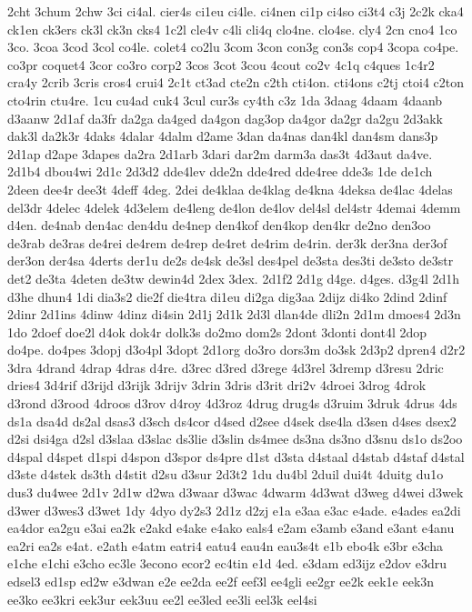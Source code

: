 {2cht
3chum
2chw
3ci
ci4al.
cier4s
ci1eu
ci4le.
ci4nen
ci1p
ci4so
ci3t4
c3j
2c2k
cka4
ck1en
ck3ers
ck3l
ck3n
cks4
1c2l
cle4v
c4li
cli4q
clo4ne.
clo4se.
cly4
2cn
cno4
1co
3co.
3coa
3cod
3col
co4le.
colet4
co2lu
3com
3con
con3g
con3s
cop4
3copa
co4pe.
co3pr
coquet4
3cor
co3ro
corp2
3cos
3cot
3cou
4cout
co2v
4c1q
c4ques
1c4r2
cra4y
2crib
3cris
cros4
crui4
2c1t
ct3ad
cte2n
c2th
cti4on.
cti4ons
c2tj
ctoi4
c2ton
cto4rin
ctu4re.
1cu
cu4ad
cuk4
3cul
cur3s
cy4th
c3z
1da
3daag
4daam
4daanb
d3aanw
2d1af
da3fr
da2ga
da4ged
da4gon
dag3op
da4gor
da2gr
da2gu
2d3akk
dak3l
da2k3r
4daks
4dalar
4dalm
d2ame
3dan
da4nas
dan4kl
dan4sm
dans3p
2d1ap
d2ape
3dapes
da2ra
2d1arb
3dari
dar2m
darm3a
das3t
4d3aut
da4ve.
2d1b4
dbou4wi
2d1c
2d3d2
dde4lev
dde2n
dde4red
dde4ree
dde3s
1de
de1ch
2deen
dee4r
dee3t
4deff
4deg.
2dei
de4klaa
de4klag
de4kna
4deksa
de4lac
4delas
del3dr
4delec
4delek
4d3elem
de4leng
de4lon
de4lov
del4sl
del4str
4demai
4demm
d4en.
de4nab
den4ac
den4du
de4nep
den4kof
den4kop
den4kr
de2no
den3oo
de3rab
de3ras
de4rei
de4rem
de4rep
de4ret
de4rim
de4rin.
der3k
der3na
der3of
der3on
der4sa
4derts
der1u
de2s
de4sk
de3sl
des4pel
de3sta
des3ti
de3sto
de3str
det2
de3ta
4deten
de3tw
dewin4d
2dex
3dex.
2d1f2
2d1g
d4ge.
d4ges.
d3g4l
2d1h
d3he
dhun4
1di
dia3s2
die2f
die4tra
di1eu
di2ga
dig3aa
2dijz
di4ko
2dind
2dinf
2dinr
2d1ins
4dinw
4dinz
di4sin
2d1j
2d1k
2d3l
dlan4de
dli2n
2d1m
dmoes4
2d3n
1do
2doef
doe2l
d4ok
dok4r
dolk3s
do2mo
dom2s
2dont
3donti
dont4l
2dop
do4pe.
do4pes
3dopj
d3o4pl
3dopt
2d1org
do3ro
dors3m
do3sk
2d3p2
dpren4
d2r2
3dra
4drand
4drap
4dras
d4re.
d3rec
d3red
d3rege
4d3rel
3dremp
d3resu
2dric
dries4
3d4rif
d3rijd
d3rijk
3drijv
3drin
3dris
d3rit
dri2v
4droei
3drog
4drok
d3rond
d3rood
4droos
d3rov
d4roy
4d3roz
4drug
drug4s
d3ruim
3druk
4drus
4ds
ds1a
dsa4d
ds2al
dsas3
d3sch
ds4cor
d4sed
d2see
d4sek
dse4la
d3sen
d4ses
dsex2
d2si
dsi4ga
d2sl
d3slaa
d3slac
ds3lie
d3slin
ds4mee
ds3na
ds3no
d3snu
ds1o
ds2oo
d4spal
d4spet
d1spi
d4spon
d3spor
ds4pre
d1st
d3sta
d4staal
d4stab
d4staf
d4stal
d3ste
d4stek
ds3th
d4stit
d2su
d3sur
2d3t2
1du
du4bl
2duil
dui4t
4duitg
du1o
dus3
du4wee
2d1v
2d1w
d2wa
d3waar
d3wac
4dwarm
4d3wat
d3weg
d4wei
d3wek
d3wer
d3wes3
d3wet
1dy
4dyo
dy2s3
2d1z
d2zj
e1a
e3aa
e3ac
e4ade.
e4ades
ea2di
ea4dor
ea2gu
e3ai
ea2k
e2akd
e4ake
e4ako
eals4
e2am
e3amb
e3and
e3ant
e4anu
ea2ri
ea2s
e4at.
e2ath
e4atm
eatri4
eatu4
eau4n
eau3s4t
e1b
ebo4k
e3br
e3cha
e1che
e1chi
e3cho
ec3le
3econo
ecor2
ec4tin
e1d
4ed.
e3dam
ed3ijz
e2dov
e3dru
edsel3
ed1sp
ed2w
e3dwan
e2e
ee2da
ee2f
eef3l
ee4gli
ee2gr
ee2k
eek1e
eek3n
ee3ko
ee3kri
eek3ur
eek3uu
ee2l
ee3led
ee3li
eel3k
eel4si
}
